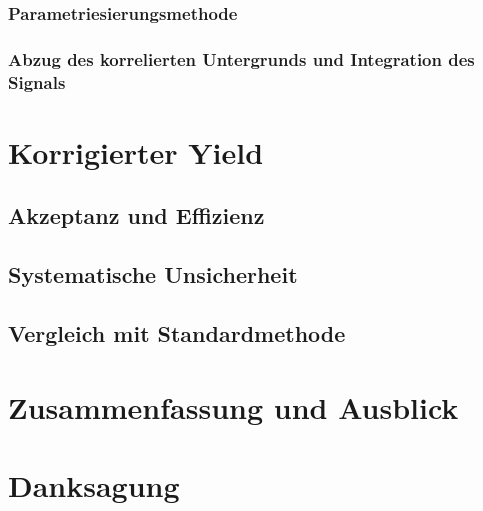 \documentclass[a4paper,11pt,twoside]{report}
\renewcommand{\,}{,\!} %
\begin{document}
\subsection{Parametriesierungsmethode} \label{s3s5s3}


\subsection{Abzug des korrelierten Untergrunds und Integration des Signals} \label{s3s5s4}


\chapter{Korrigierter Yield} \label{s4}

\section{Akzeptanz und Effizienz} \label{s4s1}


\section{Systematische Unsicherheit} \label{s4s2}


\section{Vergleich mit Standardmethode} \label{s4s3}


\chapter{Zusammenfassung und Ausblick} \label{s5}

\clearpage

\appendix
\chapter{} \label{Appendix:A}

\newpage
 

\clearpage
\chapter{Danksagung} \label{Appendix:B}

\end{document}
